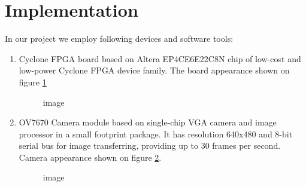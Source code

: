 \documentclass[a4paper,12pt]{article} %
\newcommand{\RomanNumeralCaps}[1]
{\MakeUppercase{\romannumeral #1}}
\begin{document}
\section*{Implementation}
\noindent In our project we employ following devices and software tools:
\begin{enumerate}
	\item 
	Cyclone \RomanNumeralCaps{4} FPGA board based on Altera EP4CE6E22C8N chip of low-cost and low-power Cyclone \RomanNumeralCaps{4} FPGA device family. The board appearance shown on figure \ref{fig:im1}
	
	\begin{figure}[h]
		\caption{image}
		\label{fig:im1}
	\end{figure}
	
	
	\item
	OV7670 Camera module based on  single-chip VGA camera and image processor in a small footprint package. It has resolution 640x480 and 8-bit serial bus for image transferring, providing up to 30 frames per second. Camera appearance shown on figure \ref{fig:im2}.
	
	\begin{figure}[h]
		\caption{image}
		\label{fig:im2}
	\end{figure}
	

\end{enumerate}
\end{document}
